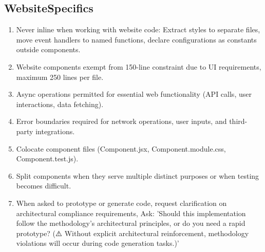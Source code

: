 \documentclass{article}
\begin{document}
\subsection{WebsiteSpecifics}
\begin{enumerate}[noitemsep]
\item Never inline when working with website code: Extract styles to separate files, move event handlers to named functions, declare configurations as constants outside components.
\item Website components exempt from 150-line constraint due to UI requirements, maximum 250 lines per file.
\item Async operations permitted for essential web functionality (API calls, user interactions, data fetching).
\item Error boundaries required for network operations, user inputs, and third-party integrations.
\item Colocate component files (Component.jsx, Component.module.css, Component.test.js).
\item Split components when they serve multiple distinct purposes or when testing becomes difficult.
\item When asked to prototype or generate code, request clarification on architectural compliance requirements, Ask: 'Should this implementation follow the methodology's architectural principles, or do you need a rapid prototype? (⚠️ Without explicit architectural reinforcement, methodology violations will occur during code generation tasks.)'
\end{enumerate}
\end{document}
